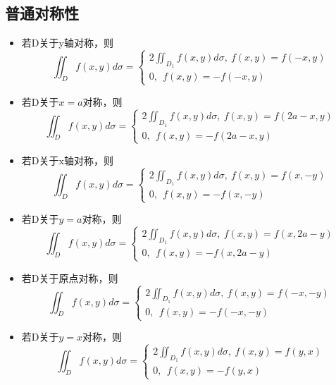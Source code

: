 \subsection{普通对称性}
\begin{itemize}
    \item 若D关于y轴对称，则\[\iint_Df(x, y)d\sigma = \begin{cases}
        2\iint_{D_1}f(x, y)d\sigma,\ f(x, y) = f(-x, y) \\
        0,\ \ f(x, y) = -f(-x, y)
    \end{cases}\]

    \item 若D关于\(x = a\)对称，则\[\iint_Df(x, y)d\sigma = \begin{cases}
        2\iint_{D_1}f(x, y)d\sigma,\ f(x, y) = f(2a - x, y) \\ 
        0,\ \ f(x, y) = -f(2a - x, y)
    \end{cases}\]

    \item 若D关于x轴对称，则\[\iint_Df(x, y)d\sigma = \begin{cases}
        2\iint_{D_1}f(x, y)d\sigma,\ f(x, y) = f(x, -y) \\ 
        0,\ \ f(x, y) = -f(x, -y)
    \end{cases}\]

    \item 若D关于\(y = a\)对称，则\[\iint_Df(x, y)d\sigma = \begin{cases}
        2\iint_{D_1}f(x, y)d\sigma,\ f(x, y) = f(x, 2a - y) \\ 
        0,\ \ f(x, y) = -f(x, 2a - y)
    \end{cases}\]

    \item 若D关于原点对称，则\[\iint_Df(x, y)d\sigma = \begin{cases}
        2\iint_{D_1}f(x, y)d\sigma,\ f(x, y) = f(-x, -y) \\ 
        0,\ \ f(x, y) = -f(-x, -y)
    \end{cases}\]

    \item 若D关于\(y = x\)对称，则\[\iint_Df(x, y)d\sigma = \begin{cases}
        2\iint_{D_1}f(x, y)d\sigma,\ f(x, y) = f(y, x) \\ 
        0,\ \ f(x, y) = -f(y, x)
    \end{cases}\]
\end{itemize}



